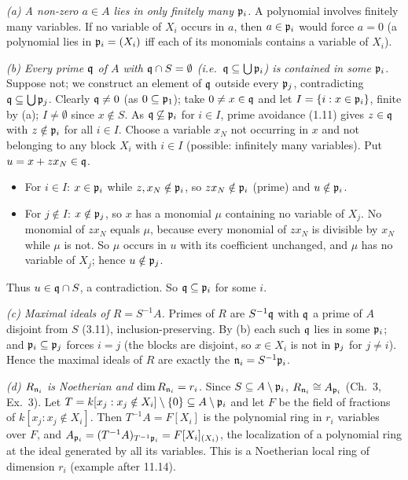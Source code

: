 \documentclass[11pt]{article}
\begin{document}
\emph{(a) A non-zero $a\in A$ lies in only finitely many $\mathfrak p_i$.} A polynomial involves finitely many variables. If no variable of $X_i$ occurs in $a$, then $a\in\mathfrak p_i$ would force $a=0$ (a polynomial lies in $\mathfrak p_i=(X_i)$ iff each of its monomials contains a variable of $X_i$).

\emph{(b) Every prime $\mathfrak q$ of $A$ with $\mathfrak q\cap S=\emptyset$ (i.e.\ $\mathfrak q\subseteq\bigcup\mathfrak p_i$) is contained in some $\mathfrak p_i$.} Suppose not; we construct an element of $\mathfrak q$ outside every $\mathfrak p_j$, contradicting $\mathfrak q\subseteq\bigcup\mathfrak p_j$. Clearly $\mathfrak q\ne0$ (as $0\subseteq\mathfrak p_1$); take $0\ne x\in\mathfrak q$ and let $I=\{i:x\in\mathfrak p_i\}$, finite by (a); $I\ne\emptyset$ since $x\notin S$. As $\mathfrak q\not\subseteq\mathfrak p_i$ for $i\in I$, prime avoidance (1.11) gives $z\in\mathfrak q$ with $z\notin\mathfrak p_i$ for all $i\in I$. Choose a variable $x_N$ not occurring in $x$ and not belonging to any block $X_i$ with $i\in I$ (possible: infinitely many variables). Put $u=x+zx_N\in\mathfrak q$.
\begin{itemize}[leftmargin=*]
\item For $i\in I$: $x\in\mathfrak p_i$ while $z,x_N\notin\mathfrak p_i$, so $zx_N\notin\mathfrak p_i$ (prime) and $u\notin\mathfrak p_i$.
\item For $j\notin I$: $x\notin\mathfrak p_j$, so $x$ has a monomial $\mu$ containing no variable of $X_j$. No monomial of $zx_N$ equals $\mu$, because every monomial of $zx_N$ is divisible by $x_N$ while $\mu$ is not. So $\mu$ occurs in $u$ with its coefficient unchanged, and $\mu$ has no variable of $X_j$; hence $u\notin\mathfrak p_j$.
\end{itemize}
Thus $u\in\mathfrak q\cap S$, a contradiction. So $\mathfrak q\subseteq\mathfrak p_i$ for some $i$.

\emph{(c) Maximal ideals of $R=S^{-1}A$.} Primes of $R$ are $S^{-1}\mathfrak q$ with $\mathfrak q$ a prime of $A$ disjoint from $S$ (3.11), inclusion-preserving. By (b) each such $\mathfrak q$ lies in some $\mathfrak p_i$; and $\mathfrak p_i\subseteq\mathfrak p_j$ forces $i=j$ (the blocks are disjoint, so $x\in X_i$ is not in $\mathfrak p_j$ for $j\ne i$). Hence the maximal ideals of $R$ are exactly the $\mathfrak n_i=S^{-1}\mathfrak p_i$.

\emph{(d) $R_{\mathfrak n_i}$ is Noetherian and $\dim R_{\mathfrak n_i}=r_i$.} Since $S\subseteq A\setminus\mathfrak p_i$, $R_{\mathfrak n_i}\cong A_{\mathfrak p_i}$ (Ch.~3, Ex.~3). Let $T=k[x_j:x_j\notin X_i]\setminus\{0\}\subseteq A\setminus\mathfrak p_i$ and let $F$ be the field of fractions of $k[x_j:x_j\notin X_i]$. Then $T^{-1}A=F[X_i]$ is the polynomial ring in $r_i$ variables over $F$, and $A_{\mathfrak p_i}=(T^{-1}A)_{T^{-1}\mathfrak p_i}=F[X_i]_{(X_i)}$, the localization of a polynomial ring at the ideal generated by all its variables. This is a Noetherian local ring of dimension $r_i$ (example after 11.14).
\end{document}
